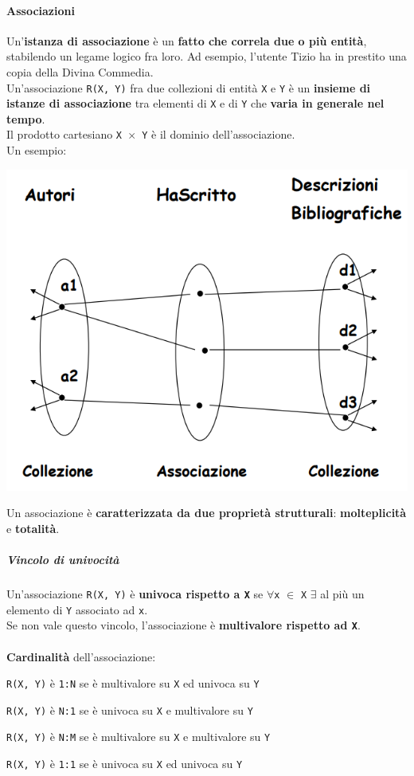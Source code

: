 \documentclass[10pt]{book}
\begin{document}
\paragraph{Associazioni} Un'\textbf{istanza di associazione} è un \textbf{fatto che correla due o più entità}, stabilendo un legame  logico fra loro. Ad esempio, l'utente Tizio ha in prestito una copia della Divina Commedia.\\
Un'associazione \texttt{R(X, Y)} fra due collezioni di entità \texttt{X} e \texttt{Y} è un \textbf{insieme di istanze di associazione} tra elementi di \texttt{X} e di \texttt{Y} che \textbf{varia in generale nel tempo}.\\
Il prodotto cartesiano \texttt{X $\times$ Y} è il dominio dell'associazione.\\
Un esempio:
\begin{center}
	\includegraphics[scale=0.6]{associazioni.png}
\end{center}
\pagebreak
Un associazione è \textbf{caratterizzata da due proprietà strutturali}: \textbf{molteplicità} e \textbf{totalità}.
\subparagraph{Vincolo di univocità} Un'associazione \texttt{R(X, Y)} è \textbf{univoca rispetto a \texttt{X}} se $\forall$\texttt{x} $\in$ \texttt{X} $\exists$ al più un elemento di \texttt{Y} associato ad \texttt{x}.\\
Se non vale questo vincolo, l'associazione è \textbf{multivalore rispetto ad \texttt{X}}.\\\\
\textbf{Cardinalità} dell'associazione:
\begin{list}{}{}
	\item \texttt{R(X, Y)} è \texttt{1:N} se è multivalore su \texttt{X} ed univoca su \texttt{Y}
	\item \texttt{R(X, Y)} è \texttt{N:1} se è univoca su \texttt{X} e multivalore su \texttt{Y}
	\item \texttt{R(X, Y)} è \texttt{N:M} se è multivalore su \texttt{X} e multivalore  su \texttt{Y}
	\item \texttt{R(X, Y)} è \texttt{1:1} se è univoca su \texttt{X} ed univoca su \texttt{Y}
\end{list}
\end{document}
